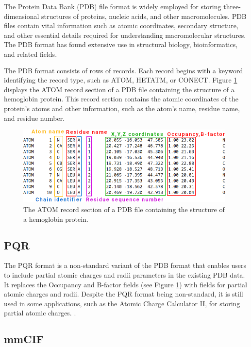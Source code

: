 \documentclass[
  digital,     %
  oneside,     %
  nosansbold,  %
  nocolorbold, %
  lof,         %
  lot,         %
]{fithesis4}
\begin{document}
The Protein Data Bank (PDB) file format is widely employed for storing three-dimensional structures of proteins, nucleic acids, and other macromolecules. PDB files contain vital information such as atomic coordinates, secondary structure, and other essential details required for understanding macromolecular structures. The PDB format has found extensive use in structural biology, bioinformatics, and related fields. \cite{pdb101}

The PDB format consists of rows of records. Each record begins with a keyword identifying the record type, such as ATOM, HETATM, or CONECT. Figure \ref{fig:pdb} displays the ATOM record section of a PDB file containing the structure of a hemoglobin protein. This record section contains the atomic coordinates of the protein's atoms and other information, such as the atom's name, residue name, and residue number. \cite{chimera_pqrfile}

\begin{figure}[htbp]
  \begin{center}
    \includegraphics[width=11cm]{figures/pdb_format.png}
  \end{center}
  \caption{The ATOM record section of a PDB file containing the structure of a hemoglobin protein.}
  \label{fig:pdb}
\end{figure}

\subsection{PQR}
\label{subsection:pqr}

The PQR format is a non-standard variant of the PDB format that enables users to include partial atomic charges and radii parameters in the existing PDB data. It replaces the Occupancy and B-factor fields (see Figure \ref{fig:pdb}) with fields for partial atomic charges and radii. \cite{pqrfile,apbs_pqrfile} Despite the PQR format being non-standard, it is still used in some applications, such as the Atomic Charge Calculator II, for storing partial atomic charges. \cite{racek2020acc2}.

\subsection{mmCIF}
\label{subsection:mmcif}
\end{document}
